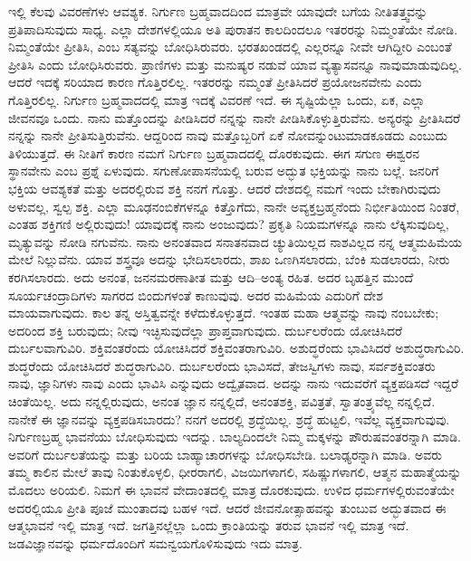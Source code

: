 ಇಲ್ಲಿ ಕೆಲವು ವಿವರಣೆಗಳು ಆವಶ್ಯಕ. ನಿರ್ಗುಣ ಬ್ರಹ್ಮವಾದದಿಂದ ಮಾತ್ರವೇ ಯಾವುದೇ ಬಗೆಯ ನೀತಿತತ್ತ್ವವನ್ನು ಪ್ರತಿಪಾದಿಸುವುದು ಸಾಧ್ಯ. ಎಲ್ಲಾ ದೇಶಗಳಲ್ಲಿಯೂ ಅತಿ ಪುರಾತನ ಕಾಲದಿಂದಲೂ ಇತರರನ್ನು ನಿಮ್ಮಂತೆಯೇ ನೋಡಿ. ನಿಮ್ಮಂತೆಯೇ ಪ್ರೀತಿಸಿ, ಎಂಬ ಸತ್ಯವನ್ನು ಬೋಧಿಸಿರುವರು. ಭರತಖಂಡದಲ್ಲಿ ಎಲ್ಲರನ್ನೂ ನೀವೇ ಆಗಿದ್ದೀರಿ ಎಂಬಂತೆ ಪ್ರೀತಿಸಿ ಎಂದು ಬೋಧಿಸಿರುವರು. ಪ್ರಾಣಿಗಳು ಮತ್ತು ಮನುಷ್ಯರ ನಡುವೆ ಯಾವ ವ್ಯತ್ಯಾಸವನ್ನೂ ನಾವುಮಾಡುವುದಿಲ್ಲ. ಆದರೆ ಇದಕ್ಕೆ ಸರಿಯಾದ ಕಾರಣ ಗೊತ್ತಿರಲಿಲ್ಲ. ಇತರರನ್ನು ನಮ್ಮಂತೆ ಪ್ರೀತಿಸಿದರೆ ಪ್ರಯೋಜನವೇನು ಎಂದು ಗೊತ್ತಿರಲಿಲ್ಲ. ನಿರ್ಗುಣ ಬ್ರಹ್ಮವಾದದಲ್ಲಿ ಮಾತ್ರ ಇದಕ್ಕೆ ವಿವರಣೆ ಇದೆ. ಈ ಸೃಷ್ಟಿಯೆಲ್ಲಾ ಒಂದು, ಏಕ, ಎಲ್ಲಾ ಜೀವನವೂ ಒಂದು. ನಾನು ಮತ್ತೊಂದನ್ನು ಪೀಡಿಸಿದರೆ ನನ್ನನ್ನು ನಾನೇ ಪೀಡಿಸಿಕೊಳ್ಳುತ್ತಿರುವೆನು. ಅನ್ಯರನ್ನು ಪ್ರೀತಿಸಿದರೆ ನನ್ನನ್ನು ನಾನೇ ಪ್ರೀತಿಸುತ್ತಿರುವೆನು. ಆದ್ದರಿಂದ ನಾವು ಮತ್ತೊಬ್ಬರಿಗೆ ಏಕೆ ನೋವನ್ನುಂಟುಮಾಡಕೂಡದು ಎಂಬುದು ತಿಳಿಯುತ್ತದೆ. ಈ ನೀತಿಗೆ ಕಾರಣ ನಮಗೆ ನಿರ್ಗುಣ ಬ್ರಹ್ಮವಾದದಲ್ಲಿ ದೊರಕುವುದು. ಈಗ ಸಗುಣ ಈಶ್ವರನ ಸ್ಥಾನವೇನು ಎಂಬ ಪ್ರಶ್ನೆ ಏಳುವುದು. ಸಗುಣೋಪಾಸನೆಯಲ್ಲಿ ಬರುವ ಅದ್ಭುತ ಭಕ್ತಿಯನ್ನು ನಾನು ಬಲ್ಲೆ. ಜನರಿಗೆ ಭಕ್ತಿಯ ಆವಶ್ಯಕತೆ ಮತ್ತು ಅದರಲ್ಲಿರುವ ಶಕ್ತಿ ನನಗೆ ಗೊತ್ತು. ಆದರೆ ದೇಶದಲ್ಲಿ ನಮಗೆ ಇಂದು ಬೇಕಾಗಿರುವುದು ಅಳುವಲ್ಲ, ಸ್ವಲ್ಪ ಶಕ್ತಿ. ಎಲ್ಲಾ ಮೂಢನಂಬಿಕೆಗಳನ್ನೂ ಕಿತ್ತೊಗೆದು, ನಾನೇ ಅವ್ಯಕ್ತಬ್ರಹ್ಮನೆಂದು ನಿರ್ಭೀತಿಯಿಂದ ನಿಂತರೆ, ಎಂತಹ ಶಕ್ತಿಗಣಿ ಅಲ್ಲಿರುವುದು! ಯಾವುದಕ್ಕೆ ನಾನು ಅಂಜುವುದು? ಪ್ರಕೃತಿ ನಿಯಮಗಳನ್ನೂ ನಾನು ಲೆಕ್ಕಿಸುವುದಿಲ್ಲ, ಮೃತ್ಯುವನ್ನು ನೋಡಿ ನಗುವೆನು. ನಾನು ಅನಂತವಾದ ಸನಾತನವಾದ ಚ್ಯುತಿಯಿಲ್ಲದ ನಾಶವಿಲ್ಲದ ನನ್ನ ಆತ್ಮಮಹಿಮೆಯ ಮೇಲೆ ನಿಲ್ಲುವೆನು. ಯಾವ ಶಸ್ತ್ರವೂ ಅದನ್ನು ಭೇದಿಸಲಾರದು, ಶಾಖ ಒಣಗಿಸಲಾರದು, ಬೆಂಕಿ ಸುಡಲಾರದು, ನೀರು ಕರಗಿಸಲಾರದು. ಅದು ಅನಂತ, ಜನನಮರಣಾತೀತ ಮತ್ತು ಆದಿ–ಅಂತ್ಯ ರಹಿತ. ಅದರ ಬೃಹತ್ತಿನ ಮುಂದೆ ಸೂರ್ಯಚಂದ್ರಾದಿಗಳು ಸಾಗರದ ಬಿಂದುಗಳಂತೆ ಕಾಣುವುವು. ಅದರ ಮಹಿಮೆಯ ಎದುರಿಗೆ ದೇಶ ಮಾಯವಾಗುವುದು. ಕಾಲ ತನ್ನ ಅಸ್ತಿತ್ವವನ್ನೇ ಕಳೆದುಕೊಳ್ಳುತ್ತದೆ. ಇಂತಹ ಮಹಾ ಆತ್ಮವನ್ನು ನಾವು ನಂಬಬೇಕು; ಅದರಿಂದ ಶಕ್ತಿ ಬರುವುದು; ನೀವು ಇಚ್ಛಿಸುವುದೆಲ್ಲಾ ಪ್ರಾಪ್ತವಾಗುವುದು. ದುರ್ಬಲರೆಂದು ಯೋಚಿಸಿದರೆ ದುರ್ಬಲವಾಗುವಿರಿ. ಶಕ್ತಿವಂತರೆಂದು ಯೋಚಿಸಿದರೆ ಶಕ್ತಿವಂತರಾಗುವಿರಿ. ಅಶುದ್ಧರೆಂದು ಭಾವಿಸಿದರೆ ಅಶುದ್ಧರಾಗುವಿರಿ. ಶುದ್ಧರೆಂದು ಯೋಚಿಸಿದರೆ ಶುದ್ಧರಾಗುವಿರಿ. ದುರ್ಬಲರೆಂದು ಭಾವಿಸದೆ, ತೇಜಸ್ವಿಗಳು ನಾವು, ಸರ್ವಶಕ್ತಿವಂತರು ನಾವು, ಜ್ಞಾನಿಗಳು ನಾವು ಎಂದು ಭಾವಿಸಿ ಎನ್ನುವುದು ಅದ್ವೈತವಾದ. ಅದನ್ನು ನಾನು ಇದುವರೆಗೆ ವ್ಯಕ್ತಪಡಿಸದೆ ಇದ್ದರೆ ಚಿಂತೆಯಿಲ್ಲ. ಅದು ನನ್ನಲ್ಲಿರುವುದು, ಅನಂತ ಜ್ಞಾನ ನನ್ನಲ್ಲಿದೆ, ಅನಂತಶಕ್ತಿ, ಪವಿತ್ರತೆ, ಸ್ವಾತಂತ್ರ್ಯವೆಲ್ಲ ನನ್ನಲ್ಲಿದೆ. ನಾನೇಕೆ ಈ ಜ್ಞಾನವನ್ನು ವ್ಯಕ್ತಪಡಿಸಬಾರದು? ನನಗೆ ಅದರಲ್ಲಿ ಶ್ರದ್ಧೆಯಿಲ್ಲ. ಶ್ರದ್ಧೆ ಹುಟ್ಟಲಿ, ಇವೆಲ್ಲ ವ್ಯಕ್ತವಾಗುವುವು. ನಿರ್ಗುಣಬ್ರಹ್ಮ ಭಾವನೆಯು ಬೋಧಿಸುವುದು ಇದನ್ನು. ಬಾಲ್ಯದಿಂದಲೇ ನಿಮ್ಮ ಮಕ್ಕಳನ್ನು ಪೌರುಷವಂತರನ್ನಾಗಿ ಮಾಡಿ. ಅವರಿಗೆ ದುರ್ಬಲತೆಯನ್ನು ಮತ್ತು ಬರಿಯ ಬಾಹ್ಯಾಚಾರಗಳನ್ನು ಬೋಧಿಸಬೇಡಿ. ಬಲಾಢ್ಯರನ್ನಾಗಿ ಮಾಡಿ. ಅವರು ತಮ್ಮ ಕಾಲಿನ ಮೇಲೆ ತಾವು ನಿಂತುಕೊಳ್ಳಲಿ, ಧೀರರಾಗಲಿ, ವಿಜಯಿಗಳಾಗಲಿ, ಸಹಿಷ್ಣುಗಳಾಗಲಿ, ಆತ್ಮನ ಮಹಾತ್ಮೆಯನ್ನು ಮೊದಲು ಅರಿಯಲಿ. ನಿಮಗೆ ಈ ಭಾವನೆ ವೇದಾಂತದಲ್ಲಿ ಮಾತ್ರ ದೊರಕುವುದು. ಉಳಿದ ಧರ್ಮಗಳಲ್ಲಿರುವಂತೆಯೇ ಅದರಲ್ಲಿಯೂ ಪ್ರೀತಿ ಪೂಜೆ ಮುಂತಾದವು ಬಹಳ ಇದೆ. ಆದರೆ ಜೀವನೋತ್ಸಾಹವನ್ನು ತುಂಬುವ ಅದ್ಭುತವಾದ ಈ ಆತ್ಮಭಾವನೆ ಇಲ್ಲಿ ಮಾತ್ರ ಇದೆ. ಜಗತ್ತಿನಲ್ಲೆಲ್ಲಾ ಒಂದು ಕ್ರಾಂತಿಯನ್ನು ತರುವ ಭಾವನೆ ಇಲ್ಲಿ ಮಾತ್ರ ಇದೆ. ಜಡವಿಜ್ಞಾನವನ್ನು ಧರ್ಮದೊಂದಿಗೆ ಸಮನ್ವಯಗೊಳಿಸುವುದು ಇದು ಮಾತ್ರ.


